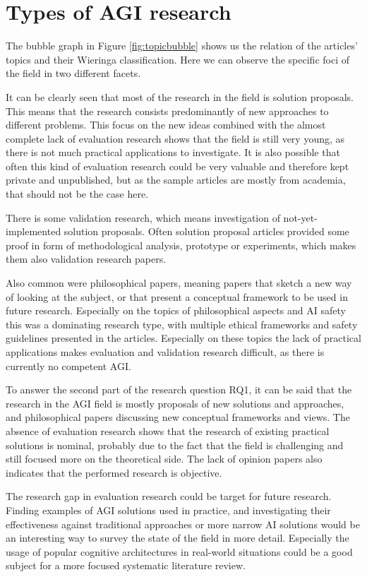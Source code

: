 \section{Types of AGI research}

The bubble graph in Figure \ref{fig:topicbubble} shows us the relation of the
articles' topics and their Wieringa classification. Here we can observe the
specific foci of the field in two different facets.

It can be clearly seen that most of the research in the field is solution
proposals. This means that the research consists predominantly of new approaches
to different problems. This focus on the new ideas combined with the almost
complete lack of evaluation research shows that the field is still very young,
as there is not much practical applications to investigate. It is also possible
that often this kind of evaluation research could be very valuable and therefore
kept private and unpublished, but as the sample articles are mostly from
academia, that should not be the case here. 

There is some validation research, which means investigation of
not-yet-implemented solution proposals. Often solution proposal articles
provided some proof in form of methodological analysis, prototype or
experiments, which makes them also validation research papers.

Also common were philosophical papers, meaning papers that sketch a new way of
looking at the subject, or that present a conceptual framework to be used in
future research. Especially on the topics of philosophical aspects and AI safety
this was a dominating research type, with multiple ethical frameworks and safety
guidelines presented in the articles. Especially on these topics the lack of
practical applications makes evaluation and validation research difficult, as
there is currently no competent AGI.

To answer the second part of the research question RQ1, it can be said that the
research in the AGI field is mostly proposals of new solutions and approaches,
and philosophical papers discussing new conceptual frameworks and views. The
absence of evaluation research shows that the research of existing practical
solutions is nominal, probably due to the fact that the field is challenging and
still focused more on the theoretical side. The lack of opinion papers
also indicates that the performed research is objective.

The research gap in evaluation research could be target for future research.
Finding examples of AGI solutions used in practice, and investigating their
effectiveness against traditional approaches or more narrow AI solutions would
be an interesting way to survey the state of the field in more detail.
Especially the usage of popular cognitive architectures in real-world situations
could be a good subject for a more focused systematic literature review. 


